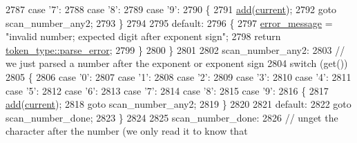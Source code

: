 \begin{DoxyCode}
2787             \textcolor{keywordflow}{case} \textcolor{charliteral}{'7'}:
2788             \textcolor{keywordflow}{case} \textcolor{charliteral}{'8'}:
2789             \textcolor{keywordflow}{case} \textcolor{charliteral}{'9'}:
2790             \{
2791                 \hyperlink{classnlohmann_1_1detail_1_1lexer_acec899d31af1fd647911e46e8535c283}{add}(\hyperlink{classnlohmann_1_1detail_1_1lexer_a47169f9aaf0da4c9885e61d3109859aa}{current});
2792                 \textcolor{keywordflow}{goto} scan\_number\_any2;
2793             \}
2794 
2795             \textcolor{keywordflow}{default}:
2796             \{
2797                 \hyperlink{classnlohmann_1_1detail_1_1lexer_ae2a15e440f1889e0ab0c6a35344e48df}{error\_message} = \textcolor{stringliteral}{"invalid number; expected digit after exponent sign"};
2798                 \textcolor{keywordflow}{return} \hyperlink{classnlohmann_1_1detail_1_1lexer_a3f313cdbe187cababfc5e06f0b69b098a456e19aeafa334241c7ff3f589547f9d}{token\_type::parse\_error};
2799             \}
2800         \}
2801 
2802 scan\_number\_any2:
2803         \textcolor{comment}{// we just parsed a number after the exponent or exponent sign}
2804         \textcolor{keywordflow}{switch} (\textcolor{keyword}{get}())
2805         \{
2806             \textcolor{keywordflow}{case} \textcolor{charliteral}{'0'}:
2807             \textcolor{keywordflow}{case} \textcolor{charliteral}{'1'}:
2808             \textcolor{keywordflow}{case} \textcolor{charliteral}{'2'}:
2809             \textcolor{keywordflow}{case} \textcolor{charliteral}{'3'}:
2810             \textcolor{keywordflow}{case} \textcolor{charliteral}{'4'}:
2811             \textcolor{keywordflow}{case} \textcolor{charliteral}{'5'}:
2812             \textcolor{keywordflow}{case} \textcolor{charliteral}{'6'}:
2813             \textcolor{keywordflow}{case} \textcolor{charliteral}{'7'}:
2814             \textcolor{keywordflow}{case} \textcolor{charliteral}{'8'}:
2815             \textcolor{keywordflow}{case} \textcolor{charliteral}{'9'}:
2816             \{
2817                 \hyperlink{classnlohmann_1_1detail_1_1lexer_acec899d31af1fd647911e46e8535c283}{add}(\hyperlink{classnlohmann_1_1detail_1_1lexer_a47169f9aaf0da4c9885e61d3109859aa}{current});
2818                 \textcolor{keywordflow}{goto} scan\_number\_any2;
2819             \}
2820 
2821             \textcolor{keywordflow}{default}:
2822                 \textcolor{keywordflow}{goto} scan\_number\_done;
2823         \}
2824 
2825 scan\_number\_done:
2826         \textcolor{comment}{// unget the character after the number (we only read it to know that}

\end{DoxyCode}
